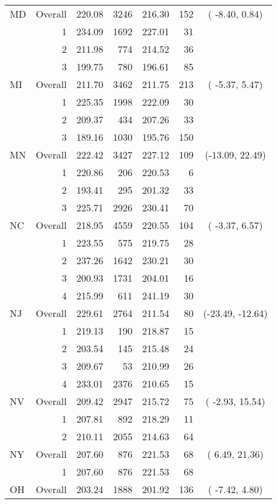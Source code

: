 \begin{longtable}{lrrr@{\extracolsep{.25cm}}rrc}
MD & Overall & 220.08 & 3246 & 216.30 & 152 & ( -8.40,   0.84) \\ 
   & 1 & 234.09 & 1692 & 227.01 &  31 &  \\ 
   & 2 & 211.98 & 774 & 214.52 &  36 &  \\ 
   & 3 & 199.75 & 780 & 196.61 &  85 &  \\ 
   \hline
MI & Overall & 211.70 & 3462 & 211.75 & 213 & ( -5.37,   5.47) \\ 
   & 1 & 225.35 & 1998 & 222.09 &  30 &  \\ 
   & 2 & 209.37 & 434 & 207.26 &  33 &  \\ 
   & 3 & 189.16 & 1030 & 195.76 & 150 &  \\ 
   \hline
MN & Overall & 222.42 & 3427 & 227.12 & 109 & (-13.09,  22.49) \\ 
   & 1 & 220.86 & 206 & 220.53 &   6 &  \\ 
   & 2 & 193.41 & 295 & 201.32 &  33 &  \\ 
   & 3 & 225.71 & 2926 & 230.41 &  70 &  \\ 
   \hline
NC & Overall & 218.95 & 4559 & 220.55 & 104 & ( -3.37,   6.57) \\ 
   & 1 & 223.55 & 575 & 219.75 &  28 &  \\ 
   & 2 & 237.26 & 1642 & 230.21 &  30 &  \\ 
   & 3 & 200.93 & 1731 & 204.01 &  16 &  \\ 
   & 4 & 215.99 & 611 & 241.19 &  30 &  \\ 
   \hline
NJ & Overall & 229.61 & 2764 & 211.54 &  80 & (-23.49, -12.64) \\ 
   & 1 & 219.13 & 190 & 218.87 &  15 &  \\ 
   & 2 & 203.54 & 145 & 215.48 &  24 &  \\ 
   & 3 & 209.67 &  53 & 210.99 &  26 &  \\ 
   & 4 & 233.01 & 2376 & 210.65 &  15 &  \\ 
   \hline
NV & Overall & 209.42 & 2947 & 215.72 &  75 & ( -2.93,  15.54) \\ 
   & 1 & 207.81 & 892 & 218.29 &  11 &  \\ 
   & 2 & 210.11 & 2055 & 214.63 &  64 &  \\ 
   \hline
NY & Overall & 207.60 & 876 & 221.53 &  68 & (  6.49,  21.36) \\ 
   & 1 & 207.60 & 876 & 221.53 &  68 &  \\ 
   \hline
OH & Overall & 203.24 & 1888 & 201.92 & 136 & ( -7.42,   4.80) \\ 

\end{longtable}

